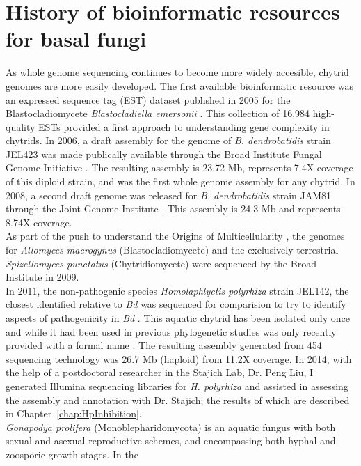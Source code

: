 \section{History of bioinformatic resources for basal fungi}
As whole genome sequencing continues to become more widely accesible,
chytrid genomes are more easily developed. The first available
bioinformatic resource was an expressed sequence tag (EST) dataset
published in 2005 for the Blastocladiomycete \textit{Blastocladiella
  emersonii} \cite{Ribichich2005}. This collection of 16,984
high-quality ESTs provided a first approach to understanding gene
complexity in chytrids. In 2006, a draft assembly for the genome of
\textit{B. dendrobatidis} strain JEL423 was made publically available
through the Broad Institute Fungal Genome Initiative \cite{Bden}. The resulting assembly is 23.72 Mb,
represents 7.4X coverage of this diploid strain, and was the first
whole genome assembly for any chytrid. In 2008, a second draft genome
was released for \textit{B. dendrobatidis} strain JAM81 through the
Joint Genome Institute \cite{Bde2}. This
assembly is 24.3 Mb and represents 8.74X coverage. \\
\indent As part of the push to understand the Origins of
Multicellularity \cite{RuizTrillo2007}, the genomes for 
\textit{Allomyces macrogynus} (Blastocladiomycete) and 
the exclusively terrestrial \textit{Spizellomyces punctatus} 
(Chytridiomycete) were sequenced by the Broad Institute in 2009. \\
\indent In 2011, the non-pathogenic species \textit{Homolaphlyctis
  polyrhiza} strain JEL142, the closest identified relative to
\textit{Bd} was sequenced for comparision to try to identify aspects
of pathogenicity in \textit{Bd} \cite{Joneson2011}. This aquatic chytrid 
has been isolated only once and while it had been used in previous phylogenetic 
\cite{James2000,James2006sixGene,Letcher2008} studies was only recently provided with a formal name \cite{Longcore2011}. 
The resulting assembly generated from 454 sequencing technology was 26.7 Mb
(haploid) from 11.2X coverage. In 2014, with the help of a postdoctoral researcher in the
Stajich Lab, Dr. Peng Liu, I generated Illumina sequencing libraries
for \textit{H. polyrhiza} and assisted in assessing the assembly and
annotation with Dr. Stajich; the results of which are described in
Chapter~\ref{chap:HpInhibition}.\\
\indent \textit{Gonapodya prolifera} (Monoblepharidomycota) is an
aquatic fungus with both sexual and asexual reproductive schemes, and
encompassing both hyphal and zoosporic growth stages. In the
